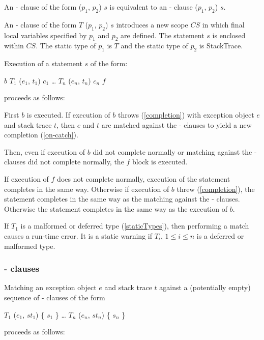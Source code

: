 \documentclass{article}
\newcommand{\code}[1]{{\sf #1}}
\begin{document}
An \ON{}-\CATCH{} clause of the form \code{\CATCH{} ($p_1$, $p_2$) $s$} is equivalent to an \ON{}-\CATCH{} clause \code{\ON{} \DYNAMIC{} \CATCH{} ($p_1$, $p_2$) $s$}.

\LMHash{}
An \ON{}-\CATCH{} clause of the form   \code{\ON{} $T$ \CATCH{} ($p_1$, $p_2$) $s$} introduces a new scope $CS$ in which final local variables specified by $p_1$ and $p_2$ are defined. The statement $s$ is enclosed within $CS$. The static type of $p_1$ is $T$ and the static type of $p_2$ is \code{StackTrace}.

\LMHash{}
Execution of a \TRY{} statement $s$ of the form:
\begin{dartCode}
\TRY{} $b$
\ON{} $T_1$ \CATCH{} ($e_1$, $t_1$) $c_1$
\ldots{}
\ON{} $T_n$ \CATCH{} ($e_n$, $t_n$) $c_n$
\FINALLY{} $f$
\end{dartCode}
proceeds as follows:

\LMHash{}
First $b$ is executed.
If execution of $b$ throws (\ref{completion}) with exception object $e$ and stack trace $t$, then $e$ and $t$ are matched against the \ON{}-\CATCH{} clauses to yield a new completion (\ref{on-catch}).

Then, even if execution of $b$ did not complete normally or matching against the \ON{}-\CATCH{} clauses did not complete normally, the $f$ block is executed.

If execution of $f$ does not complete normally,
execution of the \TRY{} statement completes in the same way.
Otherwise if execution of $b$ threw (\ref{completion}), the \TRY{} statement completes in the same way as the matching against the \ON{}-\CATCH{} clauses.
Otherwise the \TRY{} statement completes in the same way as the execution of $b$.

\LMHash{}
If $T_1$ is a malformed or deferred type (\ref{staticTypes}), then performing a match causes a run-time error.
It is a static warning if $T_i$, $1 \le i \le n$ is a deferred or malformed type.

\subsubsection{\ON{}-\CATCH{} clauses}

\LMHash{}
Matching an exception object $e$ and stack trace $t$ against a (potentially empty) sequence of \ON{}-\CATCH{} clauses of the form
\begin{dartCode}
\ON{} $T_1$ \CATCH{} ($e_1$, $st_1$) \{ $s_1$ \}
\ldots
\ON{} $T_n$ \CATCH{} ($e_n$, $st_n$) \{ $s_n$ \}
\end{dartCode}
proceeds as follows:
\end{document}
